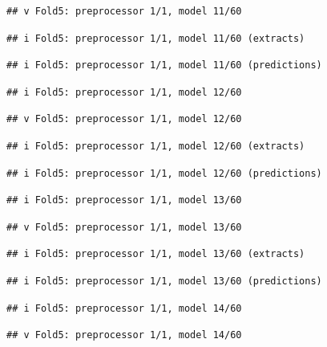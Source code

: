 \documentclass[
]{article}
\begin{document}
\begin{verbatim}
## v Fold5: preprocessor 1/1, model 11/60
\end{verbatim}

\begin{verbatim}
## i Fold5: preprocessor 1/1, model 11/60 (extracts)
\end{verbatim}

\begin{verbatim}
## i Fold5: preprocessor 1/1, model 11/60 (predictions)
\end{verbatim}

\begin{verbatim}
## i Fold5: preprocessor 1/1, model 12/60
\end{verbatim}

\begin{verbatim}
## v Fold5: preprocessor 1/1, model 12/60
\end{verbatim}

\begin{verbatim}
## i Fold5: preprocessor 1/1, model 12/60 (extracts)
\end{verbatim}

\begin{verbatim}
## i Fold5: preprocessor 1/1, model 12/60 (predictions)
\end{verbatim}

\begin{verbatim}
## i Fold5: preprocessor 1/1, model 13/60
\end{verbatim}

\begin{verbatim}
## v Fold5: preprocessor 1/1, model 13/60
\end{verbatim}

\begin{verbatim}
## i Fold5: preprocessor 1/1, model 13/60 (extracts)
\end{verbatim}

\begin{verbatim}
## i Fold5: preprocessor 1/1, model 13/60 (predictions)
\end{verbatim}

\begin{verbatim}
## i Fold5: preprocessor 1/1, model 14/60
\end{verbatim}

\begin{verbatim}
## v Fold5: preprocessor 1/1, model 14/60
\end{verbatim}
\end{document}
